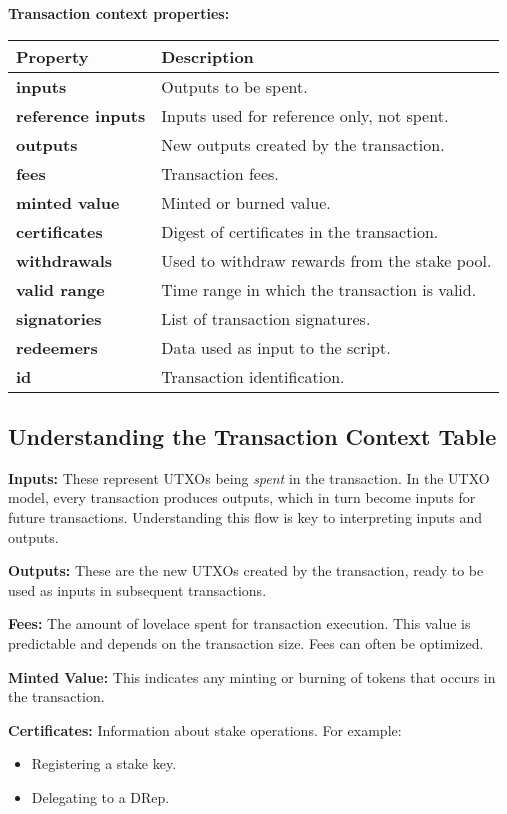 \textbf{Transaction context properties:}
\begin{center}
\begin{tabular}{|l|p{10cm}|}
\hline
\textbf{Property} & \textbf{Description} \\
\hline
\textbf{inputs} & Outputs to be spent. \\
\textbf{reference inputs} & Inputs used for reference only, not spent. \\
\textbf{outputs} & New outputs created by the transaction. \\
\textbf{fees} & Transaction fees. \\
\textbf{minted value} & Minted or burned value. \\
\textbf{certificates} & Digest of certificates in the transaction. \\
\textbf{withdrawals} & Used to withdraw rewards from the stake pool. \\
\textbf{valid range} & Time range in which the transaction is valid. \\
\textbf{signatories} & List of transaction signatures. \\
\textbf{redeemers} & Data used as input to the script. \\
\textbf{id} & Transaction identification. \\
\hline
\end{tabular}
\end{center}

\subsection{Understanding the Transaction Context Table}

\textbf{Inputs:} These represent UTXOs being \textit{spent} in the transaction. In the UTXO model, every transaction produces outputs, which in turn become inputs for future transactions. Understanding this flow is key to interpreting inputs and outputs.

\textbf{Outputs:} These are the new UTXOs created by the transaction, ready to be used as inputs in subsequent transactions.

\textbf{Fees:} The amount of lovelace spent for transaction execution. This value is predictable and depends on the transaction size. Fees can often be optimized.

\textbf{Minted Value:} This indicates any minting or burning of tokens that occurs in the transaction.

\textbf{Certificates:} Information about stake operations. For example:
\begin{itemize}
    \item Registering a stake key.
    \item Delegating to a DRep.
\end{itemize}

